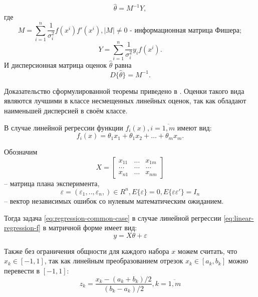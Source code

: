 \begin{theorem}
	\begin{equation}
	\hat{\theta} = M^{-1} Y,
	\end{equation}
	где 
	$$M = \sum_{i=1}^{n} \frac{1}{\sigma_i^2}f(x^{i})f'(x^{i}), |M| \ne 0 \text{ - информационная матрица Фишера};$$
	$$Y = \sum_{i=1}^{n}\frac{1}{\sigma_i^2} y_i f(x^{i}).$$
	И дисперсионная матрица оценок $\hat \theta$ равна
	\begin{equation}
		D\{ \hat \theta \} = M^{-1}.
	\end{equation}
\end{theorem}
Доказательство сформулированной теоремы приведено в \cite{fedorov}. Оценки такого вида являются лучшими в классе несмещенных линейных оценок, так как обладают наименьшей дисперсией в своём классе. 


В случае линейной регрессии функции $f_i(x), i = \overline {1, m}$ имеют вид:
\begin{equation}\label{eq:linear-regression-f}
f_i(x) = \theta_1 x_1 + \theta_1 x_2 + \dots + \theta_m x_m.
\end{equation}
  
Обозначим
\begin{equation}
X = 
\begin{bmatrix}
x_{11}	&	\dots	&	x_{1m}\\
\dots	&	\dots	&	\dots\\
x_{n1}	&	\dots	&	x_{nm}
\end{bmatrix}
\end{equation} 
-- матрица плана эксперимента, \\
\begin{equation}
\varepsilon = (\varepsilon_1,.., \varepsilon_n,) \in R^n, E\{\varepsilon\} = 0, E\{\varepsilon \varepsilon'\}=I_n
\end{equation}
-- вектор независимых ошибок со нулевым математическим ожиданием.

Тогда задача \eqref{eq:regression-common-case} в случае линейной регрессии \eqref{eq:linear-regression-f} в матричной форме имеет вид:
\begin{equation}
y = X \theta + \varepsilon
\end{equation}

Также без ограничения общности для каждого набора $x$ можем считать, что  $x_k \in [-1, 1]$, так как линейным преобразованием отрезок $x_k \in [a_k, b_k]$ можно перевести в $[-1, 1]$:
$$z_k = \frac{x_k - (a_k + b_k)/2}{(b_k - a_k)/2}, k = \overline{1, m}$$ 

